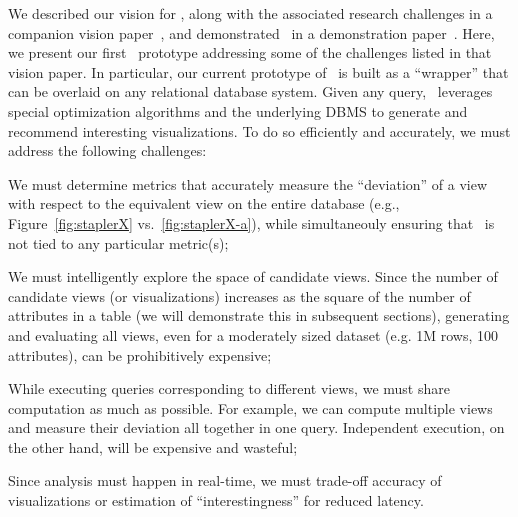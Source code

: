 We described our vision for \SeeDB, along with the associated research
challenges in a companion vision paper~\cite{DBLP:conf/vldb/Parameswaran2013},
and demonstrated \SeeDB\ in a demonstration paper~\cite{XXX}.
Here, we present our first \SeeDB\ prototype
addressing some of the challenges listed in that vision paper.
In particular, our current prototype of \SeeDB\ is built as a ``wrapper'' that
can be overlaid on any relational database system. Given any query, \SeeDB\
leverages special optimization algorithms and the underlying DBMS to generate
and recommend interesting visualizations. To do so efficiently and accurately,
we must address the following challenges:
\squishlist
\item We must determine metrics that accurately measure the ``deviation'' of a
view with respect to the equivalent view on the entire database (e.g.,
Figure~\ref{fig:staplerX} vs.~\ref{fig:staplerX-a}), while simultaneouly
ensuring that \SeeDB\ is not tied to any particular metric(s); 
\item  We must
intelligently explore the space of candidate views. Since the number of
candidate views (or visualizations) increases as the square of the number of
attributes in a table (we will demonstrate this in subsequent sections),
generating and evaluating all views, even for a moderately sized dataset (e.g.
1M rows, 100 attributes), can be prohibitively expensive;
\item While executing queries corresponding to different views, we must share
computation as much as possible. For example, 
we can compute multiple views and measure their deviation 
all together in one query. Independent execution,
on the other hand, will be expensive and wasteful;
\item Since
analysis must happen in real-time, we must trade-off accuracy
of visualizations or estimation of ``interestingness'' for reduced latency.
\squishend



